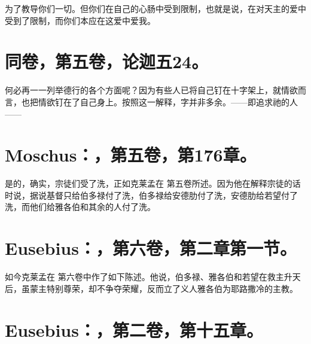 为了教导你们一切。但你们在自己的心肠中受到限制，也就是说，在对天主的爱中受到了限制，而你们本应在这爱中爱我。\par


\section{同卷，第五卷，论迦五24。}

何必再一一列举德行的各个方面呢？因为有些人已将自己钉在十字架上，就情欲而言，也把情欲钉在了自己身上。按照这一解释，字并非多余。——即追求祂的人——\par


\section{Moschus：，第五卷，第176章。}

是的，确实，宗徒们受了洗，正如克莱孟在  第五卷所述。因为他在解释宗徒的话时说，据说基督只给伯多禄付了洗，伯多禄给安德肋付了洗，安德肋给若望付了洗，而他们给雅各伯和其余的人付了洗。\par


\section{Eusebius：，第六卷，第二章第一节。}

如今克莱孟在  第六卷中作了如下陈述。他说，伯多禄、雅各伯和若望在救主升天后，虽蒙主特别尊荣，却不争夺荣耀，反而立了义人雅各伯为耶路撒冷的主教。\par


\section{Eusebius：，第二卷，第十五章。}

